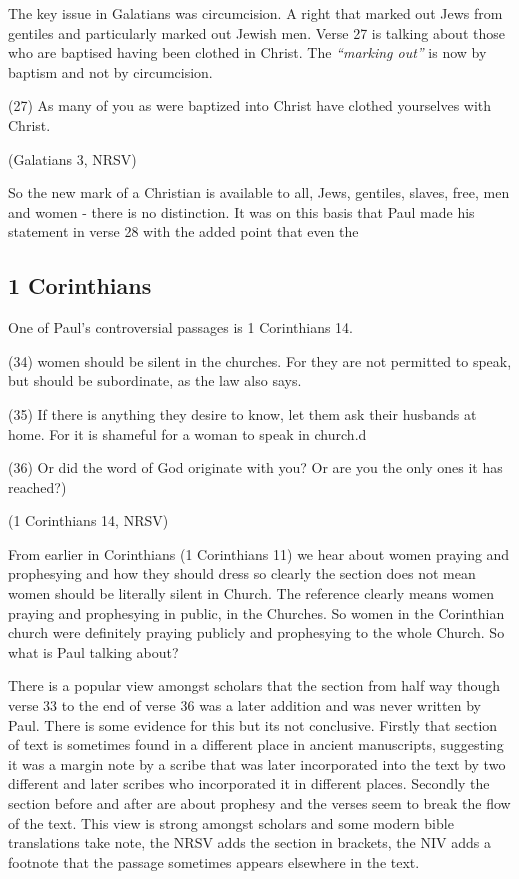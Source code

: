 \documentclass[a5paper, openany, oneside, pagesize,
headings=standardclasses, chapterprefix=false]{scrbook}
\begin{document}
The key issue in Galatians was circumcision. A right that marked out
Jews from gentiles and particularly marked out Jewish men. Verse 27 is
talking about those who are baptised having been clothed in Christ.
The \emph{``marking out''} is now by baptism and not by circumcision.

\begin{myquote}
(27) As many of you as were baptized into Christ have clothed yourselves with Christ.

(Galatians 3, NRSV)
\end{myquote}

So the new mark of a Christian is available to all, Jews, gentiles,
slaves, free, men and women - there is no distinction. It was on this
basis that Paul made his statement in verse 28 with the added point
that even the 

\subsection{1 Corinthians}

One of Paul's controversial passages is 1 Corinthians 14.

\begin{myquote}
(34) women should be silent in the churches. For they are not
permitted to speak, but should be subordinate, as the law also says.

(35) If there is anything they desire to know, let them ask their
husbands at home. For it is shameful for a woman to speak in church.d

(36) Or did the word of God originate with you? Or are you the only ones it has reached?)

(1 Corinthians 14, NRSV)
\end{myquote}

From earlier in Corinthians (1 Corinthians 11) we hear about women
praying and prophesying and how they should dress so clearly the
section does not mean women should be literally silent in Church. The
reference clearly means women praying and prophesying in public, in
the Churches. So women in the Corinthian church were definitely
praying publicly and prophesying to the whole Church. So what is Paul
talking about?    

There is a popular view amongst scholars that the section from half
way though verse 33 to the end of verse 36 was a later addition and
was never written by Paul. There is some evidence for this but its not
conclusive. Firstly that section of text is sometimes found in a
different place in ancient manuscripts, suggesting it was a margin note
by a scribe that was later incorporated into the text by two different
and later scribes who incorporated it in different places. Secondly the section before
and after are about prophesy and the verses seem to break the flow of
the text. This view is strong amongst scholars and some modern bible
translations take note, the NRSV adds the section in brackets, the NIV
adds a footnote that the passage sometimes appears elsewhere in the
text.
\end{document}
